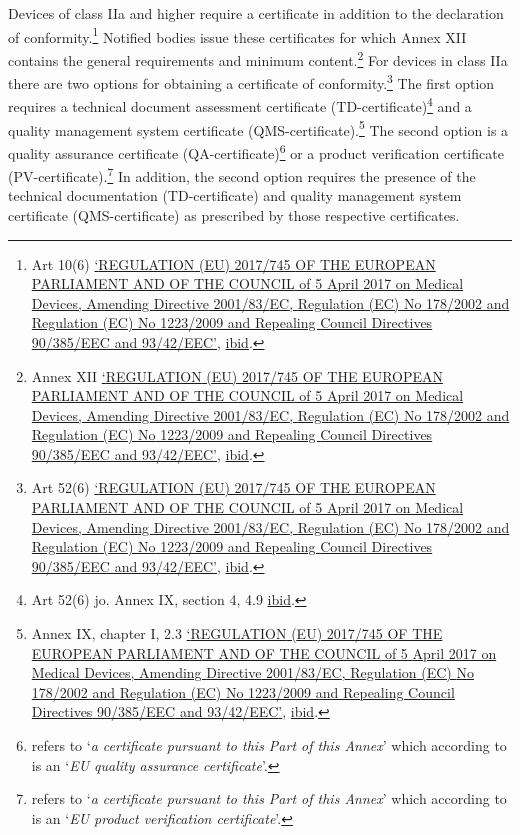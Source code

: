 \documentclass[
]{scrartcl}
\begin{document}
Devices of class IIa and higher require a certificate in addition to the declaration of conformity.\footnote{Art 10(6) \protect\hyperlink{ref-REGULATIONEU2017a}{{`{REGULATION} ({EU}) 2017/745 {OF THE EUROPEAN PARLIAMENT AND OF THE COUNCIL} of 5 {April} 2017 on Medical Devices, Amending {Directive} 2001/83/{EC}, {Regulation} ({EC}) {No} 178/2002 and {Regulation} ({EC}) {No} 1223/2009 and Repealing {Council Directives} 90/385/{EEC} and 93/42/{EEC}'}}, \protect\hyperlink{ref-REGULATIONEU2017a}{ibid}.} Notified bodies issue these certificates for which Annex XII contains the general requirements and minimum content.\footnote{Annex XII \protect\hyperlink{ref-REGULATIONEU2017a}{{`{REGULATION} ({EU}) 2017/745 {OF THE EUROPEAN PARLIAMENT AND OF THE COUNCIL} of 5 {April} 2017 on Medical Devices, Amending {Directive} 2001/83/{EC}, {Regulation} ({EC}) {No} 178/2002 and {Regulation} ({EC}) {No} 1223/2009 and Repealing {Council Directives} 90/385/{EEC} and 93/42/{EEC}'}}, \protect\hyperlink{ref-REGULATIONEU2017a}{ibid}.} For devices in class IIa there are two options for obtaining a certificate of conformity.\footnote{Art 52(6) \protect\hyperlink{ref-REGULATIONEU2017a}{{`{REGULATION} ({EU}) 2017/745 {OF THE EUROPEAN PARLIAMENT AND OF THE COUNCIL} of 5 {April} 2017 on Medical Devices, Amending {Directive} 2001/83/{EC}, {Regulation} ({EC}) {No} 178/2002 and {Regulation} ({EC}) {No} 1223/2009 and Repealing {Council Directives} 90/385/{EEC} and 93/42/{EEC}'}}, \protect\hyperlink{ref-REGULATIONEU2017a}{ibid}.} The first option requires a technical document assessment certificate (TD-certificate)\footnote{Art 52(6) jo. Annex IX, section 4, 4.9 \protect\hyperlink{ref-REGULATIONEU2017a}{ibid}.} and a quality management system certificate (QMS-certificate).\footnote{Annex IX, chapter I, 2.3 \protect\hyperlink{ref-REGULATIONEU2017a}{{`{REGULATION} ({EU}) 2017/745 {OF THE EUROPEAN PARLIAMENT AND OF THE COUNCIL} of 5 {April} 2017 on Medical Devices, Amending {Directive} 2001/83/{EC}, {Regulation} ({EC}) {No} 178/2002 and {Regulation} ({EC}) {No} 1223/2009 and Repealing {Council Directives} 90/385/{EEC} and 93/42/{EEC}'}}, \protect\hyperlink{ref-REGULATIONEU2017a}{ibid}.} The second option is a quality assurance certificate (QA-certificate)\footnote{refers to `\emph{a certificate pursuant to this Part of this Annex}' which according to is an `\emph{EU quality assurance certificate}'.} or a product verification certificate (PV-certificate).\footnote{refers to `\emph{a certificate pursuant to this Part of this Annex}' which according to is an `\emph{EU product verification certificate}'.} In addition, the second option requires the presence of the technical documentation (TD-certificate) and quality management system certificate (QMS-certificate) as prescribed by those respective certificates.
\end{document}
